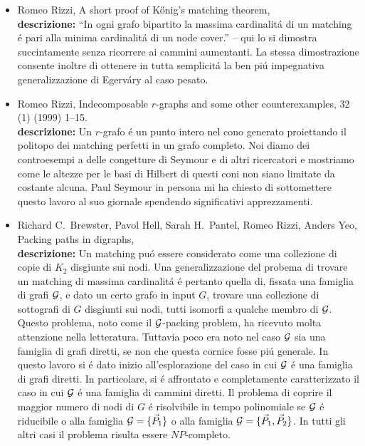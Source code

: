 \documentclass[10pt]{article}
\def\G{{\cal G}}
\def\NP{N\!P}
\begin{document}
\begin{itemize}
  \vspace{1.4mm}
  \item[] {\sc Romeo Rizzi},
   \newblock  A short proof of K\H{o}nig's matching theorem,
   \\
{\bf descrizione:}
``In ogni grafo bipartito la massima
cardinalit\'a di un matching \'e pari
alla minima cardinalit\'a di un node cover.''
-- qui lo si dimostra succintamente senza ricorrere
ai cammini aumentanti.
La stessa dimostrazione consente
inoltre di ottenere in tutta semplicit\'a
la ben pi\'u impegnativa generalizzazione di Egerv\'ary
al caso pesato.\\ 

  \vspace{1.4mm}
  \item[] {\sc Romeo Rizzi},
   \newblock  Indecomposable $r$-graphs and some other counterexamples,
    32 (1) (1999) 1--15.\\
{\bf descrizione:}
Un $r$-grafo
\'e un punto intero nel cono
generato proiettando il politopo dei matching
perfetti in un grafo completo.
Noi diamo dei controesempi a delle congetture
di Seymour e di altri ricercatori
e mostriamo come le altezze per le basi
di Hilbert di questi coni non siano limitate
da costante alcuna.
Paul Seymour in persona mi ha chiesto
di sottomettere questo lavoro al suo giornale
spendendo significativi apprezzamenti.\\

  \vspace{1.4mm}
  \item[] {\sc Richard C.~Brewster, Pavol Hell, Sarah H.~Pantel, Romeo Rizzi, Anders Yeo},
   \newblock  Packing paths in digraphs,
   \\
{\bf descrizione:}
Un matching pu\'o essere considerato
come una collezione di copie di $K_2$
disgiunte sui nodi.
Una generalizzazione del probema di trovare un matching
di massima cardinalit\'a \'e pertanto quella di,
fissata una famiglia di grafi $\G$,
e dato un certo grafo in input $G$,
trovare una collezione di sottografi di $G$ disgiunti sui nodi,
tutti isomorfi a qualche membro di $\G$.
Questo problema, noto come il $\G$-packing problem,
ha ricevuto molta attenzione nella letteratura.
Tuttavia poco era noto nel caso $\G$
sia una famiglia di grafi diretti,
se non che questa
cornice fosse pi\'u generale.
In questo lavoro si \'e dato inizio all'esplorazione
del caso in cui $\G$
\'e una famiglia di grafi diretti.
In particolare, si \'e affrontato
e completamente caratterizzato
il caso in cui $\G$ \'e una famiglia di cammini diretti.
Il problema di coprire il maggior numero di nodi di
$G$ \'e risolvibile in tempo
polinomiale se $\G$ \'e riducibile
o alla famiglia $\G=\{\vec{P}_1\}$
o alla famiglia $\G=\{\vec{P}_1,\vec{P}_2\}$.
In tutti gli altri casi il
problema risulta essere $\NP$-completo.\\


\end{itemize}
\end{document}
